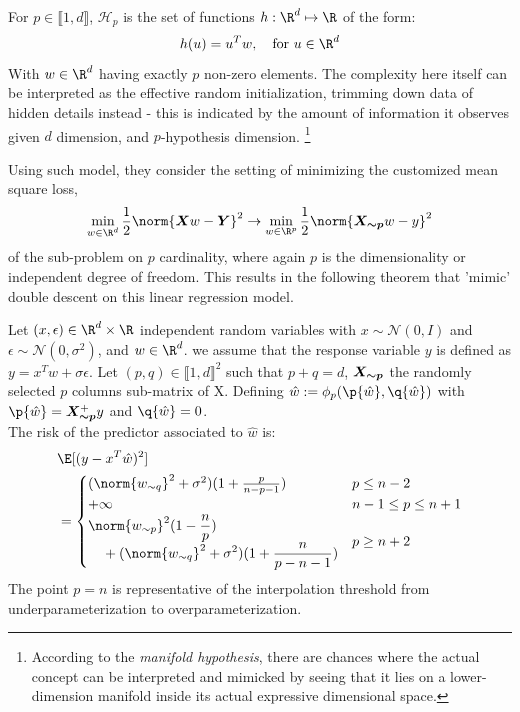 \documentclass[
  journal=largetwo,
  year=2025,
  volume=37,
]{cup-journal}
\begin{document}
\begin{definition}
For $p \in \llbracket1,d\rrbracket$, $\mathcal{H}_p$ is the set of functions $h:\R^d\mapsto \R$ of the form:
$$
h(u)=u^Tw,\quad \text{for }u \in \R^d
$$
With $w \in \R^d$ having exactly $p$ non-zero elements. The complexity here itself can be interpreted as the effective random initialization, trimming down data of hidden details instead - this is indicated by the amount of information it observes given $d$ dimension, and $p$-hypothesis dimension. \footnote{According to the \textit{manifold hypothesis}, there are chances where the actual concept can be interpreted and mimicked by seeing that it lies on a lower-dimension manifold inside its actual expressive dimensional space. }
\end{definition}
Using such model, they consider the setting of minimizing the customized mean square loss, 
\begin{equation}
\label{eq:linear_gaussian_erm}
\min_{w\in \R^d} \frac{1}{2}\norm{\bm{X} w - \bm{Y}}^2 \to \min_{w\in \R^p} \frac{1}{2}\norm{\bm{\Xp} w - y}^2
\end{equation}
of the sub-problem on $p$ cardinality, where again $p$ is the dimensionality or independent degree of freedom. This results in the following theorem that 'mimic' double descent on this linear regression model.

\begin{theorem}
\label{thm:double_descent_lr}
Let $(x, \epsilon)\in \R^d\times\R$ independent random variables with $x \sim \mathcal{N}(0,I)$  and $\epsilon \sim \mathcal{N}(0,\sigma^2)$, and $w \in \R^d$. we assume that the response variable $y$ is defined as $y=x^Tw +\sigma \epsilon$. Let $(p,q) \in \llbracket 1, d\rrbracket^2$ such that $p+q=d$, $\bm{X_{\sim p}}$ the randomly selected $p$ columns sub-matrix of X. Defining $\hat w:=\phi_p(\p{\hat w},\q{\hat w})$ with $\p{\hat w}=\bm{\Xp}^+y$ and $\q{\hat w} = 0$.\\
The risk of the predictor associated to $\hat w$ is:
\begin{equation}
    \begin{split}
        &\E[(y-x^T\hat w)^2] \\
        & = \begin{cases}
(\norm{\wq}^2+\sigma^2)(1+\frac{p}{n-p-1}) & p\leq  n-2\\
+\infty &n-1 \leq p\leq  n+1\\
\begin{split}
    &\norm{\wp}^2(1-\frac{n}{p}) \\
    &\quad +  (\norm{\wq}^2+\sigma^2)(1+\frac{n}{p-n-1})
\end{split} &p\geq n+2\end{cases}
    \end{split} 
\end{equation}
The point $p=n$ is representative of the interpolation threshold from underparameterization to overparameterization. 
\end{theorem}
\end{document}
